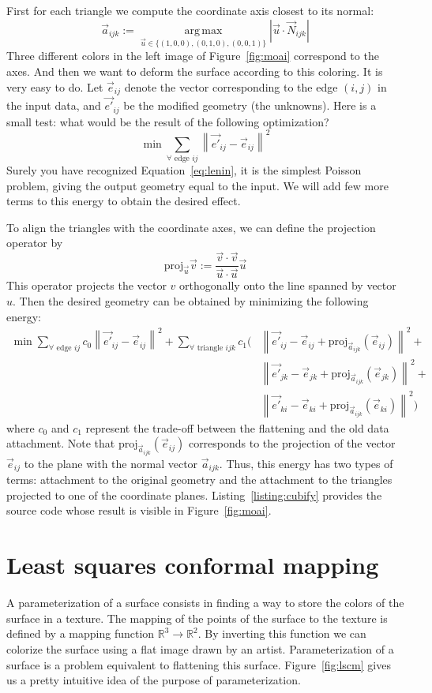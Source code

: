 \documentclass[notitlepage,oneside]{book}
\DeclareMathOperator*{\argmax}{arg\,max}
\begin{document}
First for each triangle we compute the coordinate axis closest to its normal:
$$
\vec{a}_{ijk} := \argmax\limits_{\vec{u}\in \{(1,0,0), (0,1,0), (0,0,1)\}} \left|\vec{u} \cdot \vec{N}_{ijk}\right| 
$$
Three different colors in the left image of Figure~\ref{fig:moai} correspond to the axes.
And then we want to deform the surface according to this coloring.
It is very easy to do. Let $\vec{e}_{ij}$ denote the vector corresponding to the edge $(i,j)$ in the input data,
and $\vec{e'}_{ij}$ be the modified geometry (the unknowns).
Here is a small test: what would be the result of the following optimization?
$$
\min \sum\limits_{\forall \text{~edge~} ij}\left\|\vec{e'}_{ij} - \vec{e}_{ij}\right\|^2
$$
Surely you have recognized Equation~\eqref{eq:lenin}, it is the simplest Poisson problem, giving the output geometry equal to the input.
We will add few more terms to this energy to obtain the desired effect.

To align the triangles with the coordinate axes, we can define the projection operator by
$$
\text{proj}_{\vec{u}} \vec{v} := \frac{\vec{v}\cdot\vec{v}}{\vec{u}\cdot\vec{u}}\vec{u}
$$
This operator projects the vector $v$ orthogonally onto the line spanned by vector $u$.
Then the desired geometry can be obtained by minimizing the following energy:
\begin{align*}
\min \sum\limits_{\forall \text{~edge~} ij}c_0\left\|\vec{e'}_{ij} - \vec{e}_{ij}\right\|^2 +
\sum\limits_{\forall \text{~triangle~} ijk}c_1\biggl(& \left\|\vec{e'}_{ij} - \vec{e}_{ij} + \text{proj}_{\vec{a}_{ijk}} \left( \vec{e}_{ij}\right) \right\|^2 +\\
&\left\|\vec{e'}_{jk} - \vec{e}_{jk} + \text{proj}_{\vec{a}_{ijk}} \left( \vec{e}_{jk}\right) \right\|^2 +\\
&\left\|\vec{e'}_{ki} - \vec{e}_{ki} + \text{proj}_{\vec{a}_{ijk}} \left( \vec{e}_{ki}\right) \right\|^2\biggr)
\end{align*}
where $c_0$ and $c_1$ represent the trade-off between the flattening and the old data attachment.
Note that $\text{proj}_{\vec{a}_{ijk}} \left( \vec{e}_{ij}\right)$ corresponds to the projection of the vector $\vec{e}_{ij}$ to the plane with the normal vector $\vec{a}_{ijk}$.
Thus, this energy has two types of terms: attachment to the original geometry and the attachment to the triangles projected to one of the coordinate planes.
Listing~\ref{listing:cubify} provides the source code whose result is visible in Figure~\ref{fig:moai}.

\newpage
\section{Least squares conformal mapping}
\label{sec:lscm}
A parameterization of a surface consists in finding a way to store the colors of the surface in a texture.
The mapping of the points of the surface to the texture is defined by a mapping function $\mathbb R^3 \rightarrow \mathbb R^2$.
By inverting this function we can colorize the surface using a flat image drawn by an artist.
Parameterization of a surface is a problem equivalent to flattening this surface.
Figure~\ref{fig:lscm} gives us a pretty intuitive idea of the purpose of parameterization.
\end{document}

